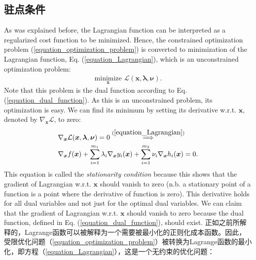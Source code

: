 \documentclass[lang=cn,10pt]{gorgeousnbook}
\numberwithin{equation}{section}%
\numberwithin{figure}{section}%
\begin{document}
\subsection{驻点条件}

As was explained before, the Lagrangian function can be interpreted as a regularized cost function to be minimized. Hence, the constrained optimization problem (\ref{equation_optimization_problem}) is converted to minimization of the Lagrangian function, Eq. (\ref{equation_Lagrangian}), which is an unconstrained optimization problem:
\begin{align}
\underset{\boldsymbol{x}}{\text{minimize}}\,\, \mathcal{L}(\boldsymbol{x},\boldsymbol{\lambda},\boldsymbol{\nu}).
\end{align}
Note that this problem is the dual function according to Eq. (\ref{equation_dual_function}). 
As this is an unconstrained problem, its optimization is easy. We can find its minimum by setting its derivative w.r.t. $\boldsymbol{x}$, denoted by $\nabla_{\boldsymbol{x}} \mathcal{L}$, to zero:
\begin{equation}
\begin{aligned}
&\nabla_{\boldsymbol{x}} \mathcal{L}(\boldsymbol{x},\boldsymbol{\lambda},\boldsymbol{\nu}) = 0 \overset{(\ref{equation_Lagrangian})}{\implies} \\
& \nabla_{\boldsymbol{x}} f(\boldsymbol{x}) + \sum_{i=1}^{m_1} \lambda_i \nabla_{\boldsymbol{x}} y_i(\boldsymbol{x}) + \sum_{i=1}^{m_2} \nu_i \nabla_{\boldsymbol{x}} h_i(\boldsymbol{x}) = 0.
\end{aligned}
\end{equation}
This equation is called the \textit{stationarity condition} because this shows that the gradient of Lagrangian w.r.t. $\boldsymbol{x}$ should vanish to zero (n.b. a stationary point of a function is a point where the derivative of function is zero). This derivative holds for all dual variables and not just for the optimal dual variables. 
We can claim that the gradient of Lagrangian w.r.t. $\boldsymbol{x}$ should vanish to zero because the dual function, defined in Eq. (\ref{equation_dual_function}), should exist.  
正如之前所解释的，Lagrange函数可以被解释为一个需要被最小化的正则化成本函数。因此，受限优化问题（\ref{equation_optimization_problem}）被转换为Lagrange函数的最小化，即方程（\ref{equation_Lagrangian}），这是一个无约束的优化问题：
\end{document}
